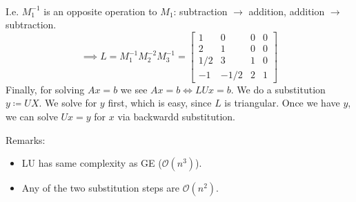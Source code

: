 \begin{example}
\begin{align*}
    \end{align*}
    I.e. $M_1^{-1}$ is an opposite operation to $M_1$:
    subtraction $\to$ addition, addition $\to$ subtraction.
    \[
        \implies L = M_1^{-1} M_2^{-2} M_3^{-1} =
        \begin{bmatrix}
            1 & 0 & 0 & 0\\
            2 & 1 & 0 & 0\\
            1/2 & 3 & 1 & 0\\
            -1 & -1/2 & 2 & 1
        \end{bmatrix}
    \]
    Finally, for solving $Ax = b$ we see
    $Ax = b \Longleftrightarrow LUx = b$.
    We do a substitution $y \coloneqq UX$.
    We solve for $y$ first, which is easy, since $L$ is triangular.
    Once we have $y$, we can solve $Ux = y$ for $x$ via backwardd substitution.
\end{example}

Remarks:
\begin{itemize}
    \item {
        LU has same complexity as GE ($\mathcal{O}(n^3)$).
    }
    \item {
        Any of the two substitution steps are $\mathcal{O}(n^2)$.
    }
\end{itemize}
